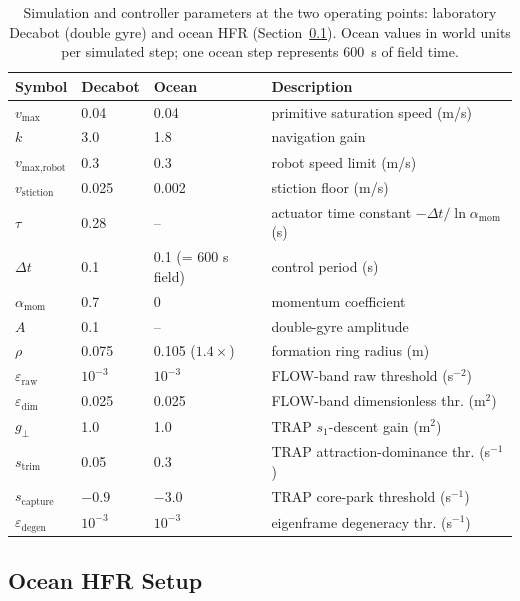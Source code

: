 \documentclass[lettersize,journal]{IEEEtran}
\begin{document}
\begin{table}[!t]
\centering
\caption{Simulation and controller parameters at the two operating
points: laboratory Decabot (double gyre) and ocean HFR
(Section~\ref{sec:ocean_sim}). Ocean values in world units per
simulated step; one ocean step represents 600~s of field time.}
\label{tab:params}
\footnotesize
\setlength{\tabcolsep}{3pt}
\begin{tabular}{llll}
\hline
\textbf{Symbol} & \textbf{Decabot} & \textbf{Ocean} & \textbf{Description} \\
\hline
$v_{\max}$ & 0.04 & 0.04 & primitive saturation speed (m/s) \\
$k$ & 3.0 & 1.8 & navigation gain \\
$v_{\text{max,robot}}$ & 0.3 & 0.3 & robot speed limit (m/s) \\
$v_{\text{stiction}}$ & 0.025 & 0.002 & stiction floor (m/s) \\
$\tau$ & 0.28 & -- & actuator time constant $-\Delta t/\ln\alpha_{\text{mom}}$ (s) \\
$\Delta t$ & 0.1 & 0.1 (= 600 s field) & control period (s) \\
$\alpha_{\text{mom}}$ & 0.7 & 0 & momentum coefficient \\
$A$ & 0.1 & -- & double-gyre amplitude \\
$\rho$ & 0.075 & 0.105 ($1.4\times$) & formation ring radius (m) \\
$\varepsilon_{\text{raw}}$ & $10^{-3}$ & $10^{-3}$ & FLOW-band raw threshold (s$^{-2}$) \\
$\varepsilon_{\text{dim}}$ & 0.025 & 0.025 & FLOW-band dimensionless thr. (m$^2$) \\
$g_\perp$ & 1.0 & 1.0 & TRAP $s_1$-descent gain (m$^2$) \\
$s_{\text{trim}}$ & 0.05 & 0.3 & TRAP attraction-dominance thr. (s$^{-1}$) \\
$s_{\text{capture}}$ & $-0.9$ & $-3.0$ & TRAP core-park threshold (s$^{-1}$) \\
$\varepsilon_{\text{degen}}$ & $10^{-3}$ & $10^{-3}$ & eigenframe degeneracy thr. (s$^{-1}$) \\
\hline
\end{tabular}
\end{table}

\subsection{Ocean HFR Setup}
\label{sec:ocean_sim}
\end{document}
